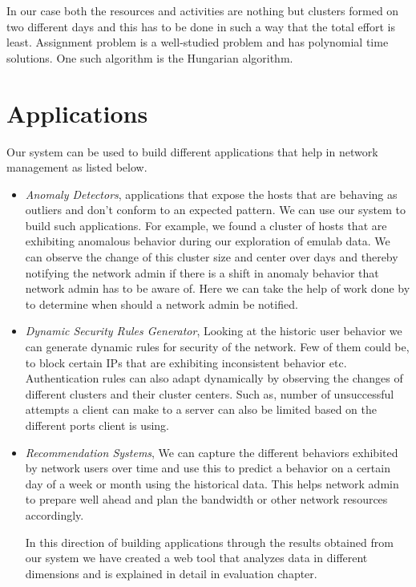 In our case both the resources and activities are nothing but clusters formed on two different days and this has to be done in such a way that the total effort is least. Assignment problem is a well-studied problem and has polynomial time solutions. One such algorithm is the Hungarian algorithm\cite{kuhn1955hungarian}.

\section{Applications} \label{applications}
Our system can be used to build different applications that help in network management as listed below.
\begin{itemize}
	
	\item \textit{Anomaly Detectors}, applications that expose the hosts that are behaving as outliers and don't conform to an expected pattern. We can use our system to build such applications. For example, we found a cluster of hosts that are exhibiting anomalous behavior during our exploration of  emulab data. We can observe the change of this cluster size and center over days and thereby notifying the network admin if there is a shift in anomaly behavior that network admin has to be aware of. Here we can take the help of  work done by \cite{DBLP:journals/corr/DeyRS17} to determine when should a network admin be notified. 
	
	\item \textit{Dynamic Security Rules Generator}, Looking at the historic user behavior we can generate dynamic rules for security of the network. Few of them could be, to block certain IPs that are exhibiting inconsistent behavior etc. Authentication rules can also adapt dynamically by observing the changes of different clusters and their cluster centers. Such as, number of unsuccessful attempts a client can make to a server can also be limited based on the different ports client is using.
	
	\item \textit{Recommendation Systems}, We can capture the different behaviors exhibited by network users over time and use this to predict a behavior on a certain day of a week or month using the historical data. This helps network admin to prepare well ahead and plan the bandwidth or other network resources accordingly.
	
	In this direction of building applications through the results obtained from our system we have created a web tool that analyzes data in different dimensions and is explained in detail in evaluation chapter.

\end{itemize}


 




